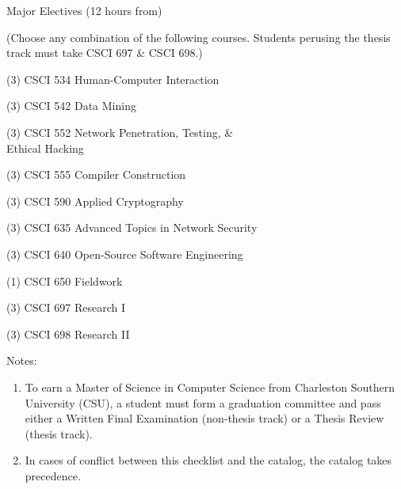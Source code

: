 \begin{reqgroup}{Major Electives (12 hours from)}
\begin{center}%
(Choose any combination of the following courses. Students perusing the thesis track must take CSCI 697 \& CSCI 698.)\vspace{-0.5em}%
\end{center}%
\begin{checklist}
\begin{minipage}[t]{0.5\linewidth}
	\item (3) CSCI 534  Human-Computer Interaction
	\item (3) CSCI 542  Data Mining
	\item (3) CSCI 552  Network Penetration, Testing, \&\\Ethical Hacking
	\item (3) CSCI 555  Compiler Construction
	\item (3) CSCI 590  Applied Cryptography
\end{minipage}
\begin{minipage}[t]{0.5\linewidth}
	\item (3) CSCI 635  Advanced Topics in Network Security
	\item (3) CSCI 640  Open-Source Software Engineering
	\item (1) CSCI 650  Fieldwork
	\item (3) CSCI 697  Research I
	\item (3) CSCI 698  Research II
\end{minipage}
\end{checklist}
\end{reqgroup}

Notes:%
\begin{enumerate}\footnotesize
	\item To earn a Master of Science in Computer Science from Charleston Southern University (CSU), a student must form a graduation committee and pass either a Written Final Examination (non-thesis track) or a Thesis Review (thesis track).
	\item In cases of conflict between this checklist and the catalog, the catalog takes precedence.
\end{enumerate}